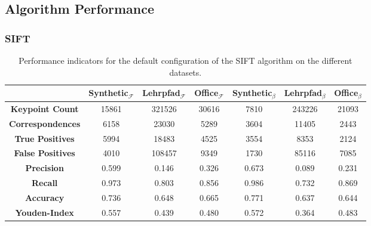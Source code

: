 \subsection{Algorithm Performance}

\subsubsection{SIFT}

\begin{table}
    {\renewcommand{\arraystretch}{1.3}%
    \setlength{\tabcolsep}{0.3em}%
    \begin{tabular}{ccccccc}
    \toprule
    \null &
            \textbf{Synthetic$_{\mathbf{\mathcal{F}}}$} &
            \textbf{Lehrpfad$_{\mathbf{\mathcal{F}}}$} &
            \textbf{Office$_{\mathbf{\mathcal{F}}}$} &
            \textbf{Synthetic$_{\mathbf{\mathcal{\beta}}}$} &
            \textbf{Lehrpfad$_{\mathbf{\mathcal{\beta}}}$} &
            \textbf{Office$_{\mathbf{\mathcal{\beta}}}$} \\
    \midrule
    \rowcolor{lightgray}
    \textbf{Keypoint Count} &
        \num{15861} & \num{321526} & \num{30616} &
        \num{7810} & \num{243226} & \num{21093} \\
    \textbf{Correspondences} &
        \num{6158} & \num{23030} & \num{5289} &
        \num{3604} & \num{11405} & \num{2443} \\
    \rowcolor{lightgray}
    \textbf{True Positives} &
        \num{5994} & \num{18483} & \num{4525} &
        \num{3554} & \num{8353} & \num{2124} \\
    \textbf{False Positives} &
        \num{4010} & \num{108457} & \num{9349} &
        \num{1730} & \num{85116} & \num{7085} \\
    \rowcolor{lightgray}
    \textbf{Precision} &
        \num{0.599} & \num{0.146} & \num{0.326} &
        \num{0.673} & \num{0.089} & \num{0.231} \\
    \textbf{Recall} &
        \num{0.973} & \num{0.803} & \num{0.856} &
        \num{0.986} & \num{0.732} & \num{0.869} \\
    \rowcolor{lightgray}
    \textbf{Accuracy} &
        \num{0.736} & \num{0.648} & \num{0.665} &
        \num{0.771} & \num{0.637} & \num{0.644} \\
    \textbf{Youden-Index} &
        \num{0.557} & \num{0.439} & \num{0.480} &
        \num{0.572} & \num{0.364} & \num{0.483} \\
    \bottomrule
    \end{tabular}
    }
    \caption{Performance indicators for the default configuration of the SIFT algorithm on the different datasets.}
\end{table}

